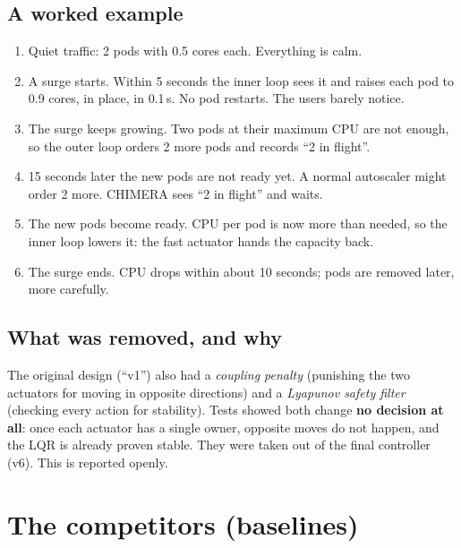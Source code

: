 \documentclass[11pt,a4paper]{article}
\begin{document}
\subsection*{A worked example}
\begin{enumerate}
\item Quiet traffic: 2 pods with 0.5 cores each. Everything is calm.
\item A surge starts. Within 5 seconds the inner loop sees it and raises each pod to
0.9 cores, in place, in 0.1\,s. No pod restarts. The users barely notice.
\item The surge keeps growing. Two pods at their maximum CPU are not enough, so the outer
loop orders 2 more pods and records ``2 in flight''.
\item 15 seconds later the new pods are not ready yet. A normal autoscaler might order 2
more. CHIMERA sees ``2 in flight'' and waits.
\item The new pods become ready. CPU per pod is now more than needed, so the inner loop
lowers it: the fast actuator hands the capacity back.
\item The surge ends. CPU drops within about 10 seconds; pods are removed later, more
carefully.
\end{enumerate}

\subsection*{What was removed, and why}
The original design (``v1'') also had a \emph{coupling penalty} (punishing the two
actuators for moving in opposite directions) and a \emph{Lyapunov safety filter} (checking
every action for stability). Tests showed both change \textbf{no decision at all}: once
each actuator has a single owner, opposite moves do not happen, and the LQR is already
proven stable. They were taken out of the final controller (v6). This is reported openly.

\section{The competitors (baselines)}
\end{document}
